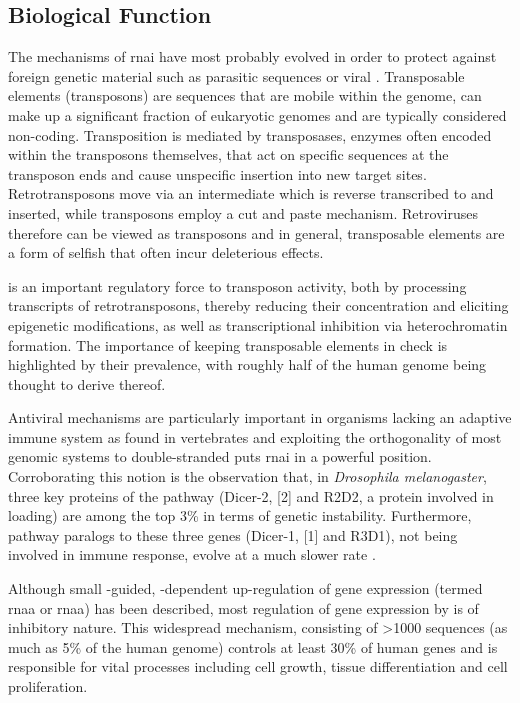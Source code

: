 \subsection{Biological Function}
The mechanisms of \acrlong{rnai} have most probably evolved in order to protect against foreign genetic material such as parasitic  sequences or viral . Transposable elements (transposons) are  sequences that are mobile within the genome, can make up a significant fraction of eukaryotic genomes and are typically considered non-coding. Transposition is mediated by transposases, enzymes often encoded within the transposons themselves, that act on specific sequences at the transposon ends and cause unspecific insertion into new target sites. Retrotransposons move via an  intermediate which is reverse transcribed to  and inserted, while  transposons employ a cut and paste mechanism. Retroviruses therefore can be viewed as transposons and in general, transposable elements are a form of selfish  that often incur deleterious effects.

 is an important regulatory force to transposon activity, both by processing transcripts of retrotransposons, thereby reducing their concentration and eliciting epigenetic modifications, as well as transcriptional inhibition via heterochromatin formation. The importance of keeping transposable elements in check is highlighted by their prevalence, with roughly half of the human genome being thought to derive thereof.

Antiviral mechanisms are particularly important in organisms lacking an adaptive immune system as found in vertebrates and exploiting the orthogonality of most genomic systems to double-stranded  puts \acrlong{rnai} in a powerful position. Corroborating this notion is the observation that, in \textit{Drosophila melanogaster}, three key proteins of the  pathway (Dicer-2, [2] and R2D2, a protein involved in  loading) are among the top 3\% in terms of genetic instability. Furthermore,  pathway paralogs to these three genes (Dicer-1, [1] and R3D1), not being involved in immune response, evolve at a much slower rate \citep{Obbard2009}.

Although small -guided, -dependent up-regulation of gene expression (termed \acrlong{rnaa} or \acrshort{rnaa}) has been described, most regulation of gene expression by  is of inhibitory nature. This widespread mechanism, consisting of \textgreater 1000  sequences (as much as 5\% of the human genome) controls at least 30\% of human genes and is responsible for vital processes including cell growth, tissue differentiation and cell proliferation.

